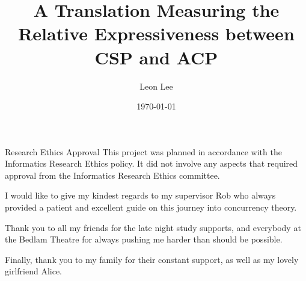\documentclass[logo,bsc,singlespacing,parskip,online]{infthesis}
\begin{document}
\begin{preliminary}

\title{A Translation Measuring the Relative Expressiveness between CSP and ACP}

\author{Leon Lee}
\date{\today}


\maketitle

\newenvironment{ethics}
   {\begin{frontenv}{Research Ethics Approval}{\LARGE}}
   {\end{frontenv}\newpage}

\begin{ethics}
This project was planned in accordance with the Informatics Research
Ethics policy. It did not involve any aspects that required approval
from the Informatics Research Ethics committee.

\standarddeclaration
\end{ethics}


\begin{acknowledgements}
   I would like to give my kindest regards to my supervisor Rob who always provided a patient and excellent guide on this journey into concurrency theory.

   Thank you to all my friends for the late night study supports, and everybody at the Bedlam Theatre for always pushing me harder than should be possible.

   Finally, thank you to my family for their constant support, as well as my lovely girlfriend Alice.
\end{acknowledgements}

\end{preliminary}
\end{document}
